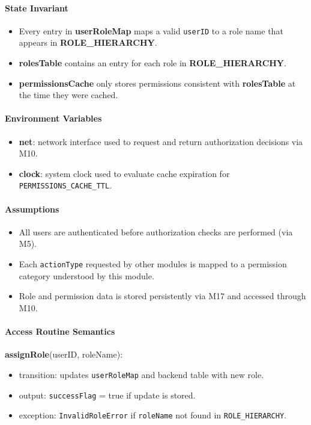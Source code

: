 \documentclass[12pt, titlepage]{article}
\begin{document}
\paragraph{State Invariant}
\begin{itemize}
  \item Every entry in \textbf{userRoleMap} maps a valid \texttt{userID} to a role name that appears in \textbf{ROLE\_HIERARCHY}.
  \item \textbf{rolesTable} contains an entry for each role in \textbf{ROLE\_HIERARCHY}.
  \item \textbf{permissionsCache} only stores permissions consistent with \textbf{rolesTable} at the time they were cached.
\end{itemize}


\paragraph{Environment Variables}
\begin{itemize}
  \item \textbf{net}: network interface used to request and return authorization decisions via M10.
  \item \textbf{clock}: system clock used to evaluate cache expiration for \texttt{PERMISSIONS\_CACHE\_TTL}.
\end{itemize}


\paragraph{Assumptions}
\begin{itemize}
  \item All users are authenticated before authorization checks are performed (via M5).
  \item Each \texttt{actionType} requested by other modules is mapped to a permission category understood by this module.
  \item Role and permission data is stored persistently via M17 and accessed through M10.
\end{itemize}


\paragraph{Access Routine Semantics}

\noindent \textbf{assignRole}(userID, roleName):
\begin{itemize}
  \item transition: updates \texttt{userRoleMap} and backend table with new role.
  \item output: \texttt{successFlag} = true if update is stored.
  \item exception: \texttt{InvalidRoleError} if \texttt{roleName} not found in \texttt{ROLE\_HIERARCHY}.
\end{itemize}
\end{document}
